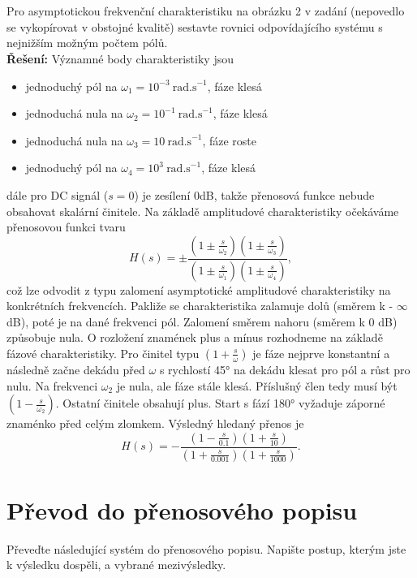 \documentclass[twoside]{article}
\begin{document}
\subsection{~}

Pro asymptotickou frekvenční charakteristiku na obrázku 2 v zadání (nepovedlo se vykopírovat v obstojné kvalitě)
sestavte rovnici odpovídajícího systému s nejnižším možným počtem pólů. \\
\textbf{Řešení:} Významné body charakteristiky jsou
\begin{itemize}
	\item jednoduchý pól na $\omega_1 = 10^{-3}~\text{rad.s}^{-1}$, fáze klesá
	\item jednoduchá nula na $\omega_2 = 10^{-1}~\text{rad.s}^{-1}$, fáze klesá
	\item jednoduchá nula na $\omega_3 = 10~\text{rad.s}^{-1}$, fáze roste
	\item jednoduchý pól na $\omega_4 = 10^3~\text{rad.s}^{-1}$, fáze klesá
\end{itemize}
dále pro DC signál ($s = 0$) je zesílení 0dB, takže přenosová funkce nebude obsahovat skalární činitele.
Na základě amplitudové charakteristiky očekáváme přenosovou funkci tvaru
\begin{equation*}
	H(s) = \pm \frac{(1 \pm \frac{s}{\omega_2})(1 \pm \frac{s}{\omega_3})}{(1 \pm \frac{s}{\omega_1})(1 \pm \frac{s}{\omega_4})},
\end{equation*}
což lze odvodit z typu zalomení asymptotické amplitudové charakteristiky na konkrétních frekvencích. Pakliže se charakteristika
zalamuje dolů (směrem k - $\infty$ dB), poté je na dané frekvenci pól. Zalomení směrem nahoru (směrem k 0 dB) způsobuje nula.
O rozložení znamének plus a mínus rozhodneme na základě fázové charakteristiky. Pro činitel typu $(1 + \frac{s}{\omega})$ je fáze
nejprve konstantní a následně začne dekádu před $\omega$ s rychlostí 45° na dekádu klesat pro pól a růst pro nulu.
Na frekvenci $\omega_2$ je nula, ale fáze stále klesá. Příslušný člen tedy musí být $(1 - \frac{s}{\omega_2})$.
Ostatní činitele obsahují plus. Start s fází 180° vyžaduje záporné znaménko před celým zlomkem. Výsledný hledaný přenos je
\begin{equation*}
	H(s) = - \frac{(1-\frac{s}{0.1})(1 +\frac{s}{10})}{(1+\frac{s}{0.001})(1 + \frac{s}{1000})}.
\end{equation*}

\section{ Převod do přenosového popisu}
\label{sec:ukol5}
Převeďte následující systém do přenosového popisu. Napište postup, kterým jste k výsledku dospěli, a vybrané mezivýsledky.
\end{document}
